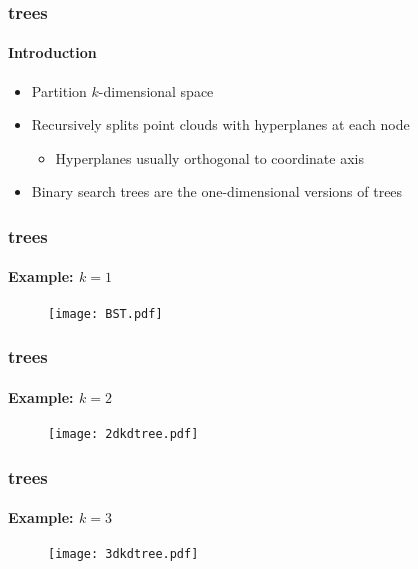 

\begin{frame}
  \frametitle{\kd trees}
  \framesubtitle{Introduction}

  \begin{itemize}
    \item Partition $k$-dimensional space
    \item Recursively splits point clouds with hyperplanes at each node
      \begin{itemize}
        \item Hyperplanes usually orthogonal to coordinate axis
      \end{itemize}
    \item Binary search trees are the one-dimensional versions of \kd trees
  \end{itemize}
\end{frame}

\begin{frame}
  \frametitle{\kd trees}
  \framesubtitle{Example: $k=1$}

  \begin{figure}
    \centering
    \texttt{[image: BST.pdf]}
  \end{figure}
  
\end{frame}

\begin{frame}
  \frametitle{\kd trees}
  \framesubtitle{Example: $k=2$}
  
  \begin{figure}
    \centering
    \texttt{[image: 2dkdtree.pdf]}
  \end{figure}

\end{frame}

\begin{frame}
  \frametitle{\kd trees}
  \framesubtitle{Example: $k=3$}
  
  \begin{figure}
    \centering
    \texttt{[image: 3dkdtree.pdf]}
  \end{figure}

\end{frame}

